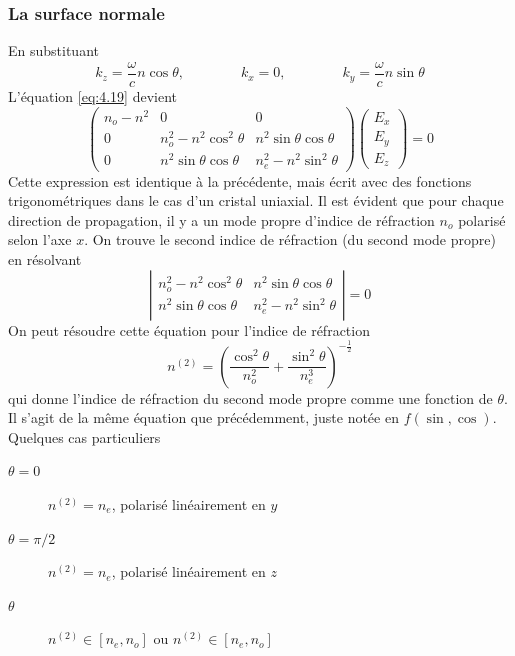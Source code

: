 \subsubsection{La surface normale}
En substituant
\begin{equation}
k_z = \dfrac{\omega}{c}n\cos\theta,\qquad\qquad k_x=0,\qquad\qquad k_y=\dfrac{\omega}{c}n\sin\theta
\end{equation}
L'équation \eqref{eq:4.19} devient
\begin{equation}
\left(\begin{array}{ccc}
n_o-n^2 & 0 & 0\\
0 & n_o^2-n^2\cos^2\theta & n^2\sin\theta\cos\theta\\
0&n^2\sin\theta\cos\theta & n_e^2-n^2\sin^2\theta
\end{array}\right)\left(\begin{array}{c}
E_x\\
E_y\\
E_z
\end{array}\right)=0
\end{equation}
Cette expression est identique à la précédente, mais écrit avec des fonctions trigonométriques dans le
cas d'un cristal uniaxial. Il est évident que pour chaque direction de propagation, il y a un mode 
propre d'indice de réfraction $n_o$ polarisé selon l'axe $x$. On trouve le second indice de réfraction
(du second mode propre) en résolvant
\begin{equation}
\left|\begin{array}{cc}
n_o^2-n^2\cos^2\theta & n^2\sin\theta\cos\theta\\
n^2\sin\theta\cos\theta & n_e^2-n^2\sin^2\theta
\end{array}\right| = 0
\end{equation}
On peut résoudre cette équation pour l'indice de réfraction
\begin{equation}
n^{(2)} = \left(\dfrac{\cos^2\theta}{n_o^2}+\dfrac{\sin^2\theta}{n_e^3}\right)^{-\frac{1}{2}}
\end{equation}
qui donne l'indice de réfraction du second mode propre comme une fonction de $\theta$. Il s'agit de la même
équation que précédemment, juste notée en $f(\sin,\cos)$. Quelques cas particuliers
\begin{description}
\item[$\theta=0$] $n^{(2)}=n_e$, polarisé linéairement en $y$
\item[$\theta=\pi/2$] $n^{(2)}=n_e$, polarisé linéairement en $z$
\item[$\theta$] $n^{(2)}\in [n_e,n_o]$ ou $n^{(2)}\in [n_e,n_o]$ 
\end{description}
